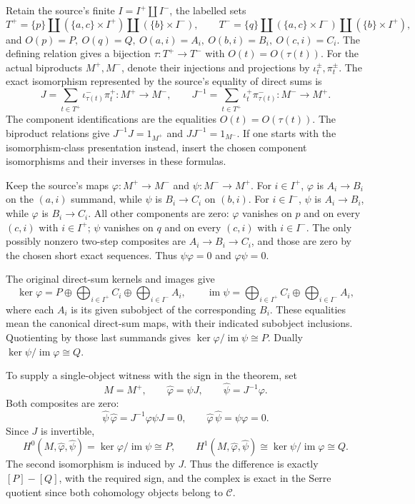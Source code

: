 Retain the source's finite \(I=I^+\amalg I^-\), the labelled sets \[
T^+=\{p\}\amalg(\{a,c\}\times I^+)\amalg(\{b\}\times I^-),\qquad
T^-=\{q\}\amalg(\{a,c\}\times I^-)\amalg(\{b\}\times I^+),
\] and \(O(p)=P,\ O(q)=Q,\ O(a,i)=A_i,\ O(b,i)=B_i,\ O(c,i)=C_i\). The defining relation gives a bijection \(\tau:T^+\to T^-\) with \(O(t)=O(\tau(t))\). For the actual biproducts \(M^+,M^-\), denote their injections and projections by \(\iota_t^\pm,\pi_t^\pm\). The exact isomorphism represented by the source's equality of direct sums is \[
J=\sum_{t\in T^+}\iota_{\tau(t)}^-\pi_t^+:M^+\to M^-,
\qquad
J^{-1}=\sum_{t\in T^+}\iota_t^+\pi_{\tau(t)}^-:M^-\to M^+.
\] The component identifications are the equalities \(O(t)=O(\tau(t))\). The biproduct relations give \(J^{-1}J=1_{M^+}\) and \(JJ^{-1}=1_{M^-}\). If one starts with the isomorphism-class presentation instead, insert the chosen component isomorphisms and their inverses in these formulas.

Keep the source's maps \(\varphi:M^+\to M^-\) and \(\psi:M^-\to M^+\). For \(i\in I^+\), \(\varphi\) is \(A_i\to B_i\) on the \((a,i)\) summand, while \(\psi\) is \(B_i\to C_i\) on \((b,i)\). For \(i\in I^-\), \(\psi\) is \(A_i\to B_i\), while \(\varphi\) is \(B_i\to C_i\). All other components are zero: \(\varphi\) vanishes on \(p\) and on every \((c,i)\) with \(i\in I^+\); \(\psi\) vanishes on \(q\) and on every \((c,i)\) with \(i\in I^-\). The only possibly nonzero two-step composites are \(A_i\to B_i\to C_i\), and those are zero by the chosen short exact sequences. Thus \(\psi\varphi=0\) and \(\varphi\psi=0\).

The original direct-sum kernels and images give \[
\ker\varphi
=P\oplus\bigoplus_{i\in I^+}C_i\oplus
 \bigoplus_{i\in I^-}A_i,\qquad
\operatorname{im}\psi
=\bigoplus_{i\in I^+}C_i\oplus\bigoplus_{i\in I^-}A_i,
\] where each \(A_i\) is its given subobject of the corresponding \(B_i\). These equalities mean the canonical direct-sum maps, with their indicated subobject inclusions. Quotienting by those last summands gives \(\ker\varphi/\operatorname{im}\psi\cong P\). Dually \(\ker\psi/\operatorname{im}\varphi\cong Q\).

To supply a single-object witness with the sign in the theorem, set \[
M=M^+,\qquad
\widehat\varphi=\psi J,\qquad
\widehat\psi=J^{-1}\varphi.
\] Both composites are zero: \[
\widehat\psi\,\widehat\varphi=J^{-1}\varphi\psi J=0,\qquad
\widehat\varphi\,\widehat\psi=\psi\varphi=0.
\] Since \(J\) is invertible, \[
H^0(M,\widehat\varphi,\widehat\psi)
=\ker\varphi/\operatorname{im}\psi\cong P,
\qquad
H^1(M,\widehat\varphi,\widehat\psi)
\cong\ker\psi/\operatorname{im}\varphi\cong Q.
\] The second isomorphism is induced by \(J\). Thus the difference is exactly \([P]-[Q]\), with the required sign, and the complex is exact in the Serre quotient since both cohomology objects belong to \(\mathcal C\).

